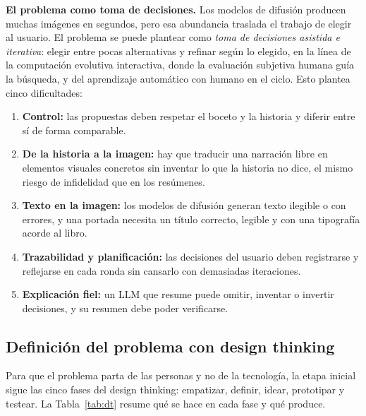 \documentclass[10pt,a4paper,twocolumn]{article}
\begin{document}
\textbf{El problema como toma de decisiones.} Los modelos de difusión producen muchas imágenes en segundos, pero esa abundancia traslada el trabajo de elegir al usuario. El problema se puede plantear como \emph{toma de decisiones asistida e iterativa}: elegir entre pocas alternativas y refinar según lo elegido, en la línea de la computación evolutiva interactiva, donde la evaluación subjetiva humana guía la búsqueda, y del aprendizaje automático con humano en el ciclo. Esto plantea cinco dificultades:
\begin{enumerate}
\item \textbf{Control:} las propuestas deben respetar el boceto y la historia y diferir entre sí de forma comparable.
\item \textbf{De la historia a la imagen:} hay que traducir una narración libre en elementos visuales concretos sin inventar lo que la historia no dice, el mismo riesgo de infidelidad que en los resúmenes.
\item \textbf{Texto en la imagen:} los modelos de difusión generan texto ilegible o con errores, y una portada necesita un título correcto, legible y con una tipografía acorde al libro.
\item \textbf{Trazabilidad y planificación:} las decisiones del usuario deben registrarse y reflejarse en cada ronda sin cansarlo con demasiadas iteraciones.
\item \textbf{Explicación fiel:} un LLM que resume puede omitir, inventar o invertir decisiones, y su resumen debe poder verificarse.
\end{enumerate}
\subsection{Definición del problema con design thinking}\label{sec:dt}
Para que el problema parta de las personas y no de la tecnología, la etapa inicial sigue las cinco fases del design thinking: empatizar, definir, idear, prototipar y testear. La Tabla~\ref{tab:dt} resume qué se hace en cada fase y qué produce.
\end{document}
